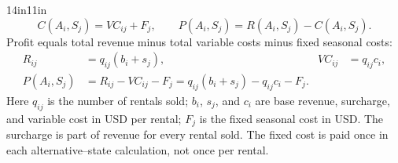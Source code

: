 \begin{CalculationLandscape}{14in}{11in}
\[C(A_i,S_j)=VC_{ij}+F_j,\qquad P(A_i,S_j)=R(A_i,S_j)-C(A_i,S_j).\]
Profit equals total revenue minus total variable costs minus fixed seasonal costs:
\begin{align*}
R_{ij}&=q_{ij}(b_i+s_j), & VC_{ij}&=q_{ij}c_i,\\
P(A_i,S_j)&=R_{ij}-VC_{ij}-F_j
=q_{ij}(b_i+s_j)-q_{ij}c_i-F_j.
\end{align*}
Here $q_{ij}$ is the number of rentals sold; $b_i$, $s_j$, and $c_i$ are base revenue, surcharge,
and variable cost in USD per rental; $F_j$ is the fixed seasonal cost in USD.
The surcharge is part of revenue for every rental sold. The fixed cost is paid
once in each alternative--state calculation, not once per rental.
\end{CalculationLandscape}
